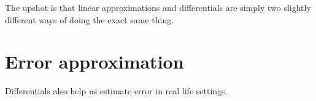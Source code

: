 \documentclass{ximera}
\begin{document}
The upshot is that linear approximations and differentials are simply
two slightly different ways of doing the exact same thing.

\section{Error approximation}

Differentials also help us estimate error in real life settings.
\end{document}
